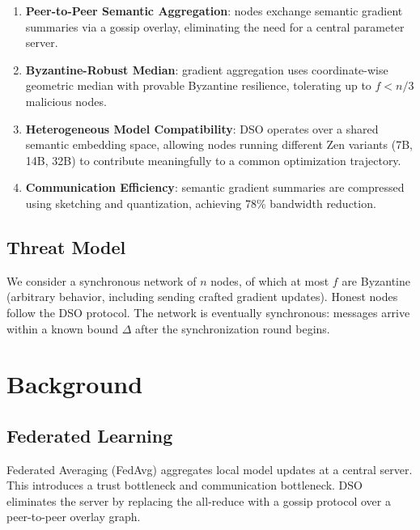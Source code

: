 \documentclass[11pt,a4paper]{article}
\begin{document}
\begin{enumerate}
    \item \textbf{Peer-to-Peer Semantic Aggregation}: nodes exchange semantic gradient
          summaries via a gossip overlay, eliminating the need for a central parameter server.
    \item \textbf{Byzantine-Robust Median}: gradient aggregation uses coordinate-wise
          geometric median with provable Byzantine resilience, tolerating up to $f < n/3$
          malicious nodes.
    \item \textbf{Heterogeneous Model Compatibility}: DSO operates over a shared semantic
          embedding space, allowing nodes running different Zen variants (7B, 14B,
          32B) to contribute meaningfully to a common optimization trajectory.
    \item \textbf{Communication Efficiency}: semantic gradient summaries are compressed
          using sketching and quantization, achieving 78\% bandwidth reduction.
\end{enumerate}

\subsection{Threat Model}

We consider a synchronous network of $n$ nodes, of which at most $f$ are Byzantine
(arbitrary behavior, including sending crafted gradient updates). Honest nodes follow
the DSO protocol. The network is eventually synchronous: messages arrive within a
known bound $\Delta$ after the synchronization round begins.

\section{Background}
\label{sec:background}

\subsection{Federated Learning}

Federated Averaging (FedAvg) \cite{mcmahan2017federated} aggregates local model updates
at a central server. This introduces a trust bottleneck and communication bottleneck.
DSO eliminates the server by replacing the all-reduce with a gossip protocol over a
peer-to-peer overlay graph.
\end{document}
